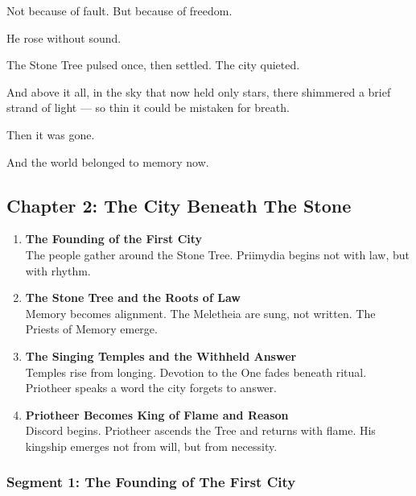 \documentclass[9pt]{article}
\begin{document}
Not because of fault.  
But because of freedom.

He rose without sound.

The Stone Tree pulsed once, then settled.  
The city quieted.

And above it all, in the sky that now held only stars, there shimmered a brief strand of light — so thin it could be mistaken for breath.

Then it was gone.

And the world belonged to memory now.

\newpage

\subsection*{Chapter 2: The City Beneath The Stone}

\vspace{1in}

\begin{center}
\begin{enumerate}
    \item \textbf{The Founding of the First City} \\
    The people gather around the Stone Tree. Priimydia begins not with law, but with rhythm.
    \vspace{1in}
    \item \textbf{The Stone Tree and the Roots of Law} \\
      Memory becomes alignment. The Meletheia are sung, not written. The Priests of Memory emerge.
    \vspace{1in}
    \item \textbf{The Singing Temples and the Withheld Answer} \\
     Temples rise from longing. Devotion to the One fades beneath ritual. Priotheer speaks a word the city forgets to answer.
    \vspace{1in}
    \item \textbf{Priotheer Becomes King of Flame and Reason} \\
    Discord begins. Priotheer ascends the Tree and returns with flame. His kingship emerges not from will, but from necessity.

\end{enumerate}
\end{center}

\newpage

\subsubsection*{Segment 1: The Founding of The First City}
\end{document}
